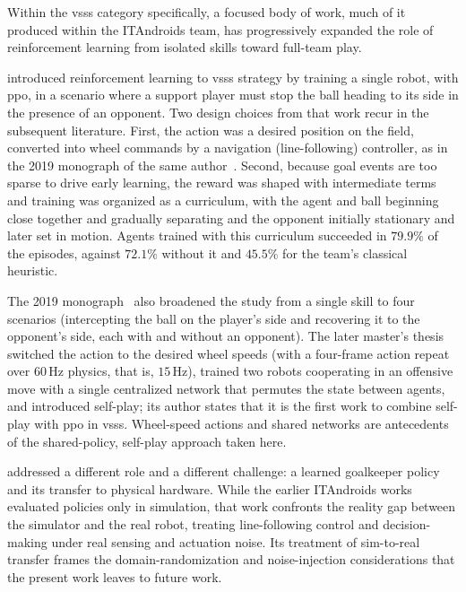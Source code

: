 Within the \gls{vsss} category specifically, a focused body of work, much of it
produced within the ITAndroids team, has progressively expanded the role of
reinforcement learning from isolated skills toward full-team play.

\textcite{medeiros2020} introduced reinforcement learning to \gls{vsss} strategy
by training a single robot, with \gls{ppo}, in a scenario where a support player must stop the ball heading to its side
in the presence of an opponent.  Two design choices from that
work recur in the subsequent literature.  First, the
action was a desired position on the field, converted into wheel commands by a navigation (line-following) controller, as in the 2019 monograph of the same author~\cite{tg_thiago}.  Second, because goal events are too sparse to
drive early learning, the reward was shaped with intermediate terms and training
was organized as a curriculum, with the agent and ball beginning close together
and gradually separating and the opponent initially stationary and later set in
motion.  Agents trained with this curriculum succeeded in $79.9\%$ of the episodes, against $72.1\%$ without it and $45.5\%$ for the
team's classical heuristic.

The 2019 monograph~\cite{tg_thiago} also broadened the study from a single skill to four scenarios (intercepting the ball on the
player's side and recovering it to the opponent's side, each with and without an
opponent).  The later master's thesis~\cite{master_thiago} switched the action to the desired wheel speeds (with a four-frame action repeat over $60$\,Hz physics, that is, $15$\,Hz),
trained two robots cooperating in an offensive move with a single centralized network that permutes the state between agents, and introduced
self-play; its author states that it is the first work to combine self-play with \gls{ppo} in \gls{vsss}.  Wheel-speed actions and shared networks are antecedents
of the shared-policy, self-play approach taken here.

\textcite{tg_Yamane} addressed a different role and a different challenge: a learned
goalkeeper policy and its transfer to physical
hardware.  While the earlier ITAndroids works evaluated policies only in
simulation, that work confronts the reality gap between the simulator and the
real robot, treating line-following control and decision-making under real
sensing and actuation noise.  Its treatment of sim-to-real transfer frames the
domain-randomization and noise-injection considerations that the present work
leaves to future work.

